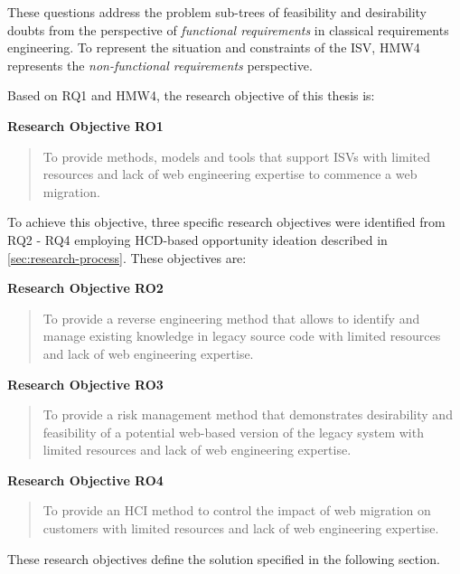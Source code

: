 These questions address the problem sub-trees of feasibility and desirability doubts from the perspective of \emph{functional requirements} in classical requirements engineering.
To represent the situation and constraints of the ISV, HMW4 represents the \emph{non-functional requirements} perspective.

Based on RQ1 and HMW4, the research objective of this thesis is:

\textbf{Research Objective RO1}

\begin{quote}
To provide methods, models and tools that support ISVs with limited resources and lack of web engineering expertise to commence a web migration.
\end{quote}

To achieve this objective, three specific research objectives were identified from RQ2 - RQ4 employing HCD-based opportunity ideation described in \cref{sec:research-process}.
These objectives are:

\textbf{Research Objective RO2}

\begin{quote}
To provide a reverse engineering method that allows to identify and manage existing knowledge in legacy source code with limited resources and lack of web engineering expertise.
\end{quote}

\textbf{Research Objective RO3}

\begin{quote}
To provide a risk management method that demonstrates desirability and feasibility of a potential web-based version of the legacy system with limited resources and lack of web engineering expertise.
\end{quote}

\textbf{Research Objective RO4}

\begin{quote}
To provide an HCI method to control the impact of web migration on customers with limited resources and lack of web engineering expertise.
\end{quote}

These research objectives define the solution specified in the following section.

